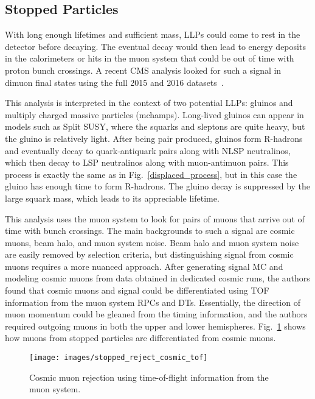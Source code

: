\documentclass[12pt]{article}
\begin{document}
    \subsection{Stopped Particles}
        With long enough lifetimes and sufficient mass, LLPs could come to rest in the detector before decaying. The eventual decay would then lead to energy deposits in the calorimeters or hits in the muon system that could be out of time with proton bunch crossings. A recent CMS analysis looked for such a signal in dimuon final states using the full 2015 and 2016 datasets~\cite{cms_stopped}. 

        This analysis is interpreted in the context of two potential LLPs: gluinos and multiply charged massive particles (mchamps). Long-lived gluinos can appear in models such as Split SUSY, where the squarks and sleptons are quite heavy, but the gluino is relatively light. After being pair produced, gluinos form R-hadrons and eventually decay to quark-antiquark pairs along with NLSP neutralinos, which then decay to LSP neutralinos along with muon-antimuon pairs. This process is exactly the same as in Fig.~\ref{displaced_process}, but in this case the gluino has enough time to form R-hadrons. The gluino decay is suppressed by the large squark mass, which leads to its appreciable lifetime.

        This analysis uses the muon system to look for pairs of muons that arrive out of time with bunch crossings. The main backgrounds to such a signal are cosmic muons, beam halo, and muon system noise. Beam halo and muon system noise are easily removed by selection criteria, but distinguishing signal from cosmic muons requires a more nuanced approach. After generating signal MC and modeling cosmic muons from data obtained in dedicated cosmic runs, the authors found that cosmic muons and signal could be differentiated using TOF information from the muon system RPCs and DTs. Essentially, the direction of muon momentum could be gleaned from the timing information, and the authors required outgoing muons in both the upper and lower hemispheres. Fig.~\ref{stopped_muon_differentiation} shows how muons from stopped particles are differentiated from cosmic muons.
        
        \noindent \begin{figure}[htbp] \begin{center}
        \texttt{[image: images/stopped\_reject\_cosmic\_tof]}
            \caption{Cosmic muon rejection using time-of-flight information from the muon system.~\cite{cms_stopped}}
        \label{stopped_muon_differentiation}
        \end{center} \end{figure}
\end{document}
